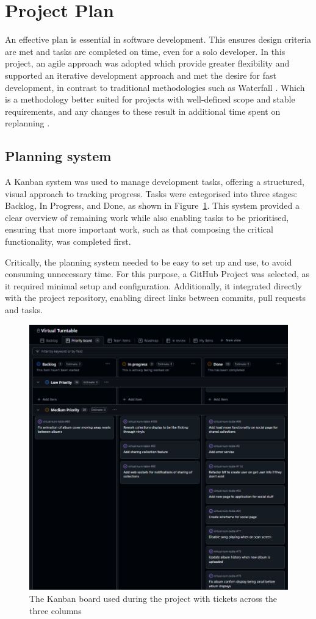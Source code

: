 \section{Project Plan}
An effective plan is essential in software development. This ensures design criteria are met and tasks are completed on time, even for a solo developer. In this project, an agile approach was adopted which provide greater flexibility and supported an iterative development approach and met the desire for fast development, in contrast to traditional methodologies such as Waterfall \cite{5222784}. Which is a methodology better suited for projects with well-defined scope and stable requirements, and any changes to these result in additional time spent on replanning \cite{andrei2019study}.

\subsection{Planning system} \label{sec:plan-system}
A Kanban system was used to manage development tasks, offering a structured, visual approach to tracking progress. Tasks were categorised into three stages: Backlog, In Progress, and Done, as shown in Figure~\ref{fig:kanban-board}. This system provided a clear overview of remaining work while also enabling tasks to be prioritised, ensuring that more important work, such as that composing the critical functionality, was completed first.

Critically, the planning system needed to be easy to set up and use, to avoid consuming unnecessary time. For this purpose, a GitHub Project was selected, as it required minimal setup and configuration. Additionally, it integrated directly with the project repository, enabling direct links between commits, pull requests and tasks.

\begin{figure}
    \centering
    \includegraphics[width=0.65\linewidth]{figures/kanban_board.png}
    \captionsetup{justification=centering,margin=2cm}
    \caption{The Kanban board used during the project with tickets across the three columns}
    \label{fig:kanban-board}
\end{figure}


